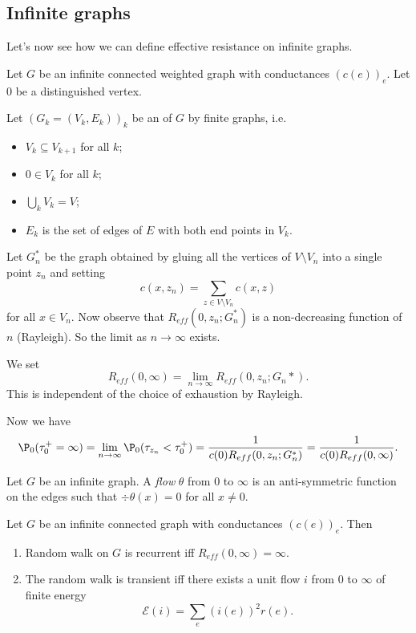 \documentclass[a4paper]{article}
\begin{document}
\subsection{Infinite graphs}
Let's now see how we can define effective resistance on infinite graphs.

Let $G$ be an infinite connected weighted graph with conductances $(c(e))_e$. Let $0$ be a distinguished vertex.

Let $(G_k = (V_k, E_k))_k$ be an  of $G$ by finite graphs, i.e.
\begin{itemize}
  \item $V_k \subseteq V_{k + 1}$ for all $k$;
  \item $0 \in V_k$ for all $k$;
  \item $\bigcup_k V_k = V$;
  \item $E_k$ is the set of edges of $E$ with both end points in $V_k$.
\end{itemize}

Let $G_n^*$ be the graph obtained by gluing all the vertices of $V \setminus V_n$ into a single point $z_n$ and setting
\[
  c(x, z_n) = \sum_{z \in V \setminus V_n} c(x, z)
\]
for all $x \in V_n$. Now observe that $R_{eff}(0, z_n; G_n^*)$ is a non-decreasing function of $n$ (Rayleigh). So the limit as $n \to \infty$ exists.

We set 
\[
  R_{eff}(0, \infty) = \lim_{n \to \infty} R_{eff}(0, z_n; G_n*).
\]
This is independent of the choice of exhaustion by Rayleigh. %

Now we have
\[
  \P_0(\tau_0^+ = \infty) = \lim_{n \to \infty} \P_0(\tau_{z_n} < \tau_0^+) = \frac{1}{c(0) R_{eff}(0, z_n; G_n^*)} = \frac{1}{c(0) R_{eff}(0, \infty)}.
\]
\begin{defi}[Flow]
  Let $G$ be an infinite graph. A \emph{flow} $\theta$ from $0$ to $\infty$ is an anti-symmetric function on the edges such that $\div \theta(x) = 0$ for all $x \not= 0$.
\end{defi}

\begin{thm}
  Let $G$ be an infinite connected graph with conductances $(c(e))_e$. Then
  \begin{enumerate}
    \item Random walk on $G$ is recurrent iff $R_{eff}(0, \infty) = \infty$.
    \item The random walk is transient iff there exists a unit flow $i$ from $0$ to $\infty$ of finite energy
      \[
        \mathcal{E}(i) = \sum_e (i(e))^2 r(e).
      \]
  \end{enumerate}
\end{thm}
\end{document}
